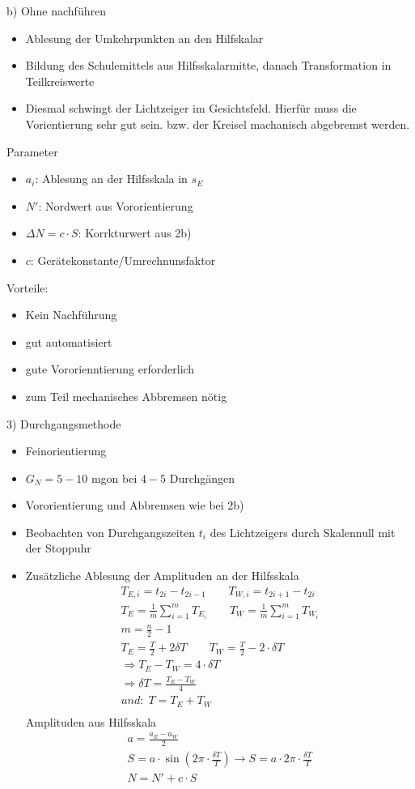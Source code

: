 \documentclass[12pt]{article}
\begin{document}
b) Ohne nachführen
\begin{itemize}
	\item Ablesung der Umkehrpunkten an den Hilfskalar
	\item Bildung des Schulemittels aus Hilfsskalarmitte, danach Transformation in Teilkreiswerte
	\item Diesmal schwingt der Lichtzeiger im Gesichtsfeld. Hierfür muss die Vorientierung sehr gut sein. bzw. der Kreisel machanisch abgebremst werden.
\end{itemize}
Parameter
\begin{itemize}
	\item $a_i$: Ablesung an der Hilfsskala in $s_E$
	\item $N'$: Nordwert aus Vororientierung
	\item $\Delta N = c \cdot S$: Korrkturwert aus 2b)
	\item $c$: Gerätekonstante/Umrechnunsfaktor 
\end{itemize}
Vorteile:
\begin{itemize}
	\item Kein Nachführung
	\item gut automatisiert
\end{itemize}
\begin{itemize}
	\item gute Vororienntierung erforderlich
	\item zum Teil mechanisches Abbremsen nötig
\end{itemize}
3) Durchgangsmethode
\begin{itemize}
	\item Feinorientierung
	\item $G_N = 5-10$ mgon bei $4-5$ Durchgängen
	\item Vororientierung und Abbremsen wie bei 2b)
	\item Beobachten von Durchgangszeiten $t_i$ des Lichtzeigers durch Skalennull mit der Stoppuhr
	\item Zusätzliche Ablesung der Amplituden an der Hilfsskala
	\begin{gather*}
		T_{E,i} = t_{2i} - t_{2i-1}\qquad T_{W,i} = t_{2i+1} - t_{2i} \\
		T_E = \frac{1}{m} \sum_{i=1}^{m} T_{E_i} \qquad T_W = \frac{1}{m} \sum_{i=1}^{m} T_{W_i} \\
		m =\frac{n}{2} - 1 \\
		T_E = \frac{T}{2} + 2 \delta T \qquad T_W = \frac{T}{2} - 2 \cdot \delta T \\
		\Longrightarrow T_E - T_W = 4 \cdot \delta T \\
		\Longrightarrow \delta T = \frac{T_E - T_W}{4} \\
		und:\; T = T_E + T_W \\
	\end{gather*}
	Amplituden aus Hilfsskala
	\begin{gather*}
		a = \frac{a_E - a_W}{2} \\
		S = a \cdot \sin(2\pi \cdot \frac{\delta T}{T}) \rightarrow S = a \cdot 2\pi \cdot \frac{\delta T}{T}\\
		N = N' + c \cdot S
	\end{gather*}
\end{itemize}
\end{document}

